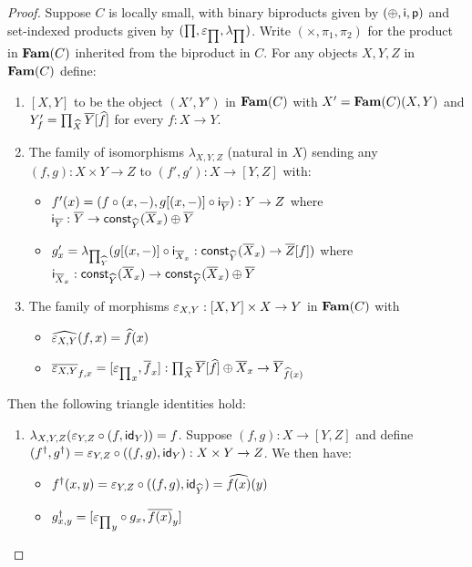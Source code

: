 \begin{proof}
Suppose $C$ is locally small, with binary biproducts given by $(\oplus,\mathsf{i},\mathsf{p})$ and set-indexed
products given by $(\prod,\varepsilon_{\prod},\lambda_{\prod})$. Write $(\times,\pi_1,\pi_2)$ for the product in
$\mathbf{Fam}(C)$ inherited from the biproduct in $C$. For any objects $X, Y, Z$ in $\mathbf{Fam}(C)$ define:

\begin{enumerate}
\item $[X, Y]$ to be the object $(X',Y')$ in $\mathbf{Fam}(C)$ with $X' = \mathbf{Fam}(C)(X,Y)$ and $Y'_f =
\prod_{\widehat{X}}\overline{Y}[\widehat{f}]$ for every $f: X \to Y$.
\item The family of isomorphisms $\lambda_{X,Y,Z}$ (natural in $X$) sending any $(f, g): X \times Y \to Z$ to
$(f', g'): X \to [Y, Z]$ with:
\begin{itemize}
\item $f'(x) = (f \circ (x, -), g[(x,-)] \circ \mathsf{i}_{\overline{Y}}):
Y \to Z$ where $\mathsf{i}_{\overline{Y}}: \overline{Y} \to \mathsf{const}_{\widehat{Y}}(\overline{X}_x) \oplus \overline{Y}$
\item $g'_x = \lambda_{\prod_{\widehat{Y}}}(g[(x,-)] \circ \mathsf{i}_{\overline{X}_x}:
\mathsf{const}_{\widehat{Y}}(\overline{X}_x) \to \overline{Z}[f])$ where $\mathsf{i}_{\overline{X}_x}: \mathsf{const}_{\widehat{Y}}(\overline{X}_x)
\to \mathsf{const}_{\widehat{Y}}(\overline{X}_x) \oplus \overline{Y}$
\end{itemize}
\item The family of morphisms $\varepsilon_{X,Y}: [X, Y] \times X \to Y$ in $\mathbf{Fam}(C)$ with
\begin{itemize}
\item $\widehat{\varepsilon_{X,Y}}(f, x) = \widehat{f}(x)$
\item $\overline{\varepsilon_{X,Y}}_{f, x} = [{\varepsilon_{\prod}}_x, \overline{f}_x]:
\prod_{\widehat{X}}\overline{Y}[\widehat{f}] \oplus \overline{X}_x \to \overline{Y}_{\widehat{f}(x)}$
\end{itemize}
\end{enumerate}

Then the following triangle identities hold:
\begin{enumerate}
\item $\lambda_{X,Y,Z}(\varepsilon_{Y,Z} \circ (f, \mathsf{id}_Y)) = f$. Suppose $(f,g): X \to [Y,Z]$ and define
$(f^\dagger, g^\dagger) = \varepsilon_{Y,Z} \circ ((f,g), \mathsf{id}_Y): X \times Y \to Z$. We then have:
\begin{itemize}
\item $f^\dagger(x,y) = \varepsilon_{Y,Z} \circ ((f,g), \mathsf{id}_{\widehat{Y}}) = \widehat{f(x)}(y)$
\item $g^\dagger_{x,y} = [{\varepsilon_{\prod}}_y \circ g_x, \overline{f(x)}_y]$
\end{itemize}


\end{enumerate}
\end{proof}

